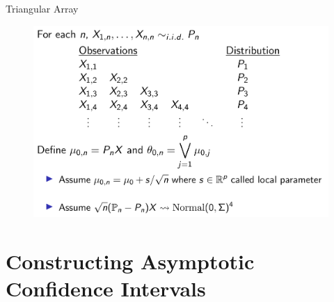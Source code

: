 \documentclass[aspectratio=169, professionalfonts, handout]{beamer}
\begin{document}
\begin{frame}{Triangular Array}
	\begin{figure}
		\includegraphics[width=.85\textwidth]{figures/triangular-array}
	\end{figure}
\end{frame}



\section{Constructing Asymptotic Confidence Intervals}
\end{document}
